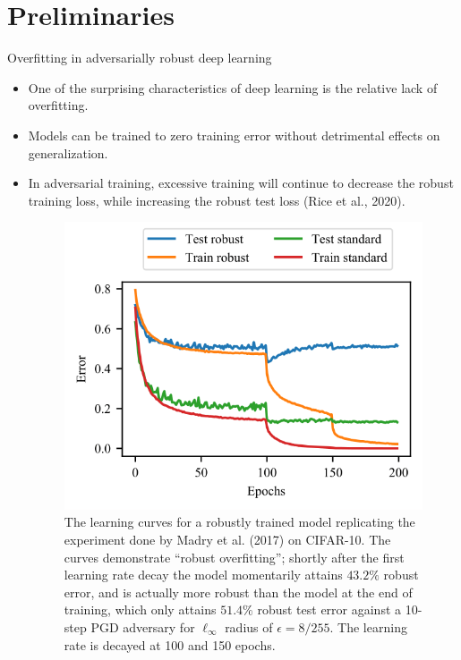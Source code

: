 \section{Preliminaries}

\begin{frame}{Overfitting in adversarially robust deep learning}
    \begin{itemize}
        \item One of the surprising characteristics of deep learning is the relative lack of overfitting. 
        \item Models can be trained to zero training error without detrimental effects on generalization.
        \item In adversarial training, excessive training will continue to decrease the robust training loss, while increasing the robust test loss (Rice et al., 2020).
        \begin{figure}
            \begin{minipage}[c]{0.55\linewidth}
                \includegraphics[height=.5\textheight]{pic/cifar10_curve.png}
            \end{minipage}
            \begin{minipage}[c]{0.4\linewidth}
                \caption{The learning curves for a robustly trained model replicating the experiment done by Madry et al. (2017) on CIFAR-10. The curves demonstrate “robust overfitting”; shortly after the first learning rate decay the model momentarily attains $43.2\%$ robust error, and is actually more robust than the model at the end of training, which only attains $51.4\%$ robust test error against a 10-step PGD adversary for $\ell_\infty$ radius of $\epsilon = 8/255$. The learning rate is decayed at 100 and 150 epochs.}\label{fig:cifar10_curve}
            \end{minipage}
        \end{figure}
    \end{itemize}
\end{frame}


